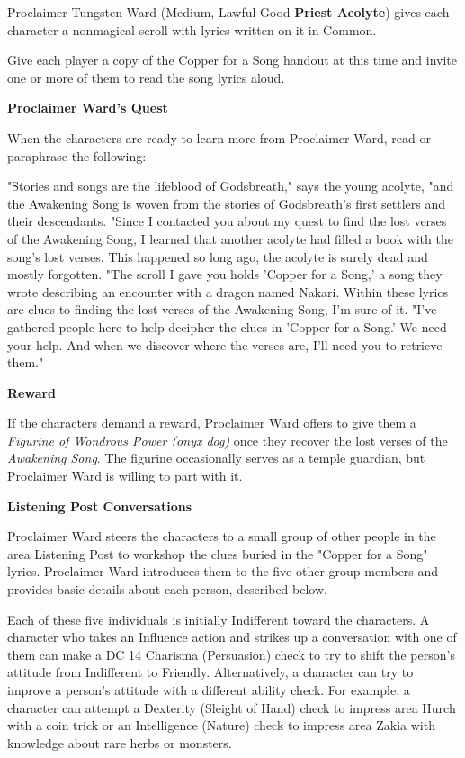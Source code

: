 \documentclass[letterpaper, 11pt, twocolumn]{dndbook}
\begin{document}
Proclaimer Tungsten Ward (Medium, Lawful Good \textbf{Priest Acolyte}) gives each character a nonmagical scroll with lyrics written on it in Common.

Give each player a copy of the Copper for a Song handout at this time and invite one or more of them to read the song lyrics aloud.


\textbf{Proclaimer Ward's Quest}

When the characters are ready to learn more from Proclaimer Ward, read or paraphrase the following:

\begin{DndReadAloud}
"Stories and songs are the lifeblood of Godsbreath," says the young acolyte, "and the Awakening Song is woven from the stories of Godsbreath's first settlers and their descendants. "Since I contacted you about my quest to find the lost verses of the Awakening Song, I learned that another acolyte had filled a book with the song's lost verses. This happened so long ago, the acolyte is surely dead and mostly forgotten. "The scroll I gave you holds 'Copper for a Song,' a song they wrote describing an encounter with a dragon named Nakari. Within these lyrics are clues to finding the lost verses of the Awakening Song, I'm sure of it. "I've gathered people here to help decipher the clues in 'Copper for a Song.' We need your help. And when we discover where the verses are, I'll need you to retrieve them."
\end{DndReadAloud}

\textbf{Reward}

If the characters demand a reward, Proclaimer Ward offers to give them a \textit{Figurine of Wondrous Power (onyx dog)} once they recover the lost verses of the \textit{Awakening Song}. The figurine occasionally serves as a temple guardian, but Proclaimer Ward is willing to part with it.

\textbf{Listening Post Conversations}

Proclaimer Ward steers the characters to a small group of other people in the area Listening Post to workshop the clues buried in the "Copper for a Song" lyrics. Proclaimer Ward introduces them to the five other group members and provides basic details about each person, described below.

Each of these five individuals is initially Indifferent toward the characters. A character who takes an Influence action and strikes up a conversation with one of them can make a DC 14 Charisma (Persuasion) check to try to shift the person's attitude from Indifferent to Friendly. Alternatively, a character can try to improve a person's attitude with a different ability check. For example, a character can attempt a Dexterity (Sleight of Hand) check to impress area Hurch with a coin trick or an Intelligence (Nature) check to impress area Zakia with knowledge about rare herbs or monsters.
\end{document}
